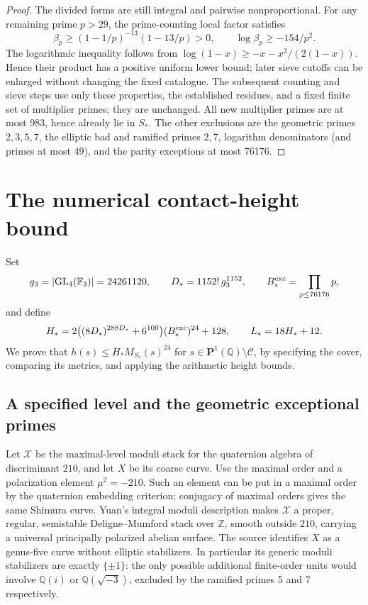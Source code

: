 \documentclass[11pt]{article}
\theoremstyle{definition}
\newcommand{\Q}{\mathbb Q}\newcommand{\Z}{\mathbb Z}
\begin{document}
\begin{proof}
The divided forms are still integral and pairwise nonproportional.
For any remaining prime \(p>29\), the prime-counting local
factor satisfies
\[
 \beta_p\ge(1-1/p)^{-13}(1-13/p)>0,\qquad
 \log\beta_p\ge-154/p^2.
\]
The logarithmic inequality follows from
\(\log(1-x)\ge-x-x^2/(2(1-x))\). Hence their product has a
positive uniform lower bound; later sieve cutoffs can be enlarged without
changing the fixed catalogue.
The subsequent counting and sieve steps use only these properties,
the established residues, and a fixed finite set of multiplier primes;
they are unchanged. All new multiplier primes are at most 983, hence
already lie in \(S_*\). The other exclusions are the geometric primes \(2,3,5,7\), the
elliptic bad and ramified primes \(2,7\), logarithm denominators
(and primes at most 49), and the parity exceptions at most 76176.
\end{proof}

\section{The numerical contact-height bound}\label{sec:height-certificate}
Set
\[
 g_3=|\mathrm{GL}_4(\mathbb F_3)|=24261120,\qquad
 D_*=1152!\,g_3^{1152},\qquad
 B_*^{\rm exc}=\prod_{p\le76176}p,
\]
and define
\begin{equation}\label{eq:optimized-H}
 H_*=2\bigl((8D_*)^{288D_*}+6^{100}\bigr)(B_*^{\rm exc})^{24}+128,
 \qquad L_*=18H_*+12.
\end{equation}
We prove that \(h(s)\le H_*M_{S_*}(s)^{24}\) for
\(s\in\mathbf P^1(\Q)\setminus\mathcal C\), by specifying
the cover, comparing its metrics, and applying the arithmetic height bounds.

\subsection{A specified level and the geometric exceptional primes}
\label{sec:geometric-primes}

Let \(\mathscr X\) be the maximal-level moduli stack for the
quaternion algebra of discriminant \(210\), and let \(X\) be its
coarse curve. Use the maximal order and a polarization element
\(\mu^2=-210\). Such an element can be put in a maximal order by
the quaternion embedding criterion; conjugacy of maximal orders gives
the same Shimura curve. Yuan's integral moduli description
\cite[Section 2.1]{YuanKS} makes \(\mathscr X\) a proper, regular,
semistable Deligne--Mumford stack over \(\Z\), smooth outside
\(210\), carrying a universal principally polarized abelian surface.
The source identifies \(X\) as a genus-five curve without elliptic
stabilizers. In particular its generic moduli stabilizers are exactly
\(\{\pm1\}\): the only possible additional finite-order units
would involve \(\Q(i)\) or \(\Q(\sqrt{-3})\), excluded by the
ramified primes 5 and 7 respectively.
\end{document}
